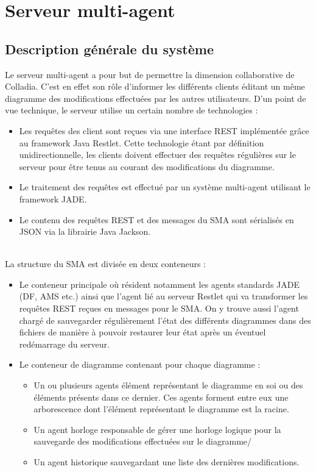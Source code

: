 \newpage
\section{Serveur multi-agent}
\subsection{Description générale du système}
Le serveur multi-agent a pour but de permettre la dimension collaborative de Colladia.
C'est en effet son rôle d'informer les différents clients éditant un même diagramme des modifications effectuées par les autres utilisateurs.
D'un point de vue technique, le serveur utilise un certain nombre de technologies :
\begin{itemize}
	\item Les requêtes des client sont reçues via une interface REST implémentée grâce au framework Java Restlet. Cette technologie étant par définition unidirectionnelle, les clients doivent effectuer des requêtes régulières sur le serveur pour être tenus au courant des modifications du diagramme.
	\item Le traitement des requêtes est effectué par un système multi-agent utilisant le framework JADE.
	\item Le contenu des requêtes REST et des messages du SMA sont sérialisés en JSON via la librairie Java Jackson.
\end{itemize}
~\\
La structure du SMA est divisée en deux conteneurs :
\begin{itemize}
	\item Le conteneur principale où résident notamment les agents standards JADE (DF, AMS etc.) ainsi que l'agent lié au serveur Restlet qui va transformer les requêtes REST reçues en messages pour le SMA. On y trouve aussi l'agent chargé de sauvegarder régulièrement l'état des différents diagrammes dans des fichiers de manière à pouvoir restaurer leur état après un éventuel redémarrage du serveur.
	\item Le conteneur de diagramme contenant pour chaque diagramme :
	\begin{itemize}
		\item Un ou plusieurs agents élément représentant le diagramme en soi ou des éléments présents dans ce dernier. Ces agents forment entre eux une arborescence dont l'élément représentant le diagramme est la racine.
		\item Un agent horloge responsable de gérer une horloge logique pour la sauvegarde des modifications effectuées sur le diagramme/
		\item Un agent historique sauvegardant une liste des dernières modifications.
	\end{itemize}
\end{itemize}


